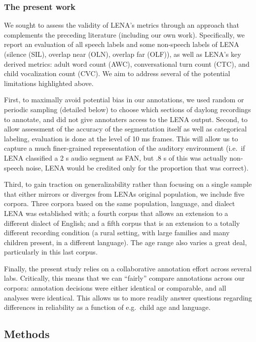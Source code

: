 \documentclass[english,floatsintext,man]{apa6}
\begin{document}
\subsubsection{The present work}\label{the-present-work}

We sought to assess the validity of LENA's metrics through an approach
that complements the preceding literature (including our own work).
Specifically, we report an evaluation of all speech labels and some
non-speech labels of LENA (silence (SIL), overlap near (OLN), overlap
far (OLF)), as well as LENA's key derived metrics: adult word count
(AWC), conversational turn count (CTC), and child vocalization count
(CVC). We aim to address several of the potential limitations
highlighted above.

First, to maximally avoid potential bias in our annotations, we used
random or periodic sampling (detailed below) to choose which sections of
daylong recordings to annotate, and did not give annotaters access to
the LENA output. Second, to allow assessment of the accuracy of the
segmentation itself as well as categorical labeling, evaluation is done
at the level of 10 ms frames. This will allow us to capture a much
finer-grained representation of the auditory environment (i.e.~if LENA
classified a 2 s audio segment as FAN, but .8 s of this was actually
non-speech noise, LENA would be credited only for the proportion that
was correct).

Third, to gain traction on generalizability rather than focusing on a
single sample that either mirrors or diverges from LENAs original
population, we include five corpora. Three corpora based on the same
population, language, and dialect LENA was established with; a fourth
corpus that allows an extension to a different dialect of English; and a
fifth corpus that is an extension to a totally different recording
condition (a rural setting, with large families and many children
present, in a different language). The age range also varies a great
deal, particularly in this last corpus.

Finally, the present study relies on a collaborative annotation effort
across several labs. Critically, this means that we can \enquote{fairly}
compare annotations across our corpora: annotation decisions were either
identical or comparable, and all analyses were identical. This allows us
to more readily answer questions regarding differences in reliability as
a function of e.g.~child age and language.

\subsection{Methods}\label{methods}
\end{document}
